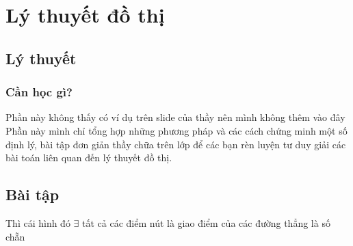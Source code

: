 \documentclass[12pt,oneside]{book}
\begin{document}
\chapter{Lý thuyết đồ thị}
\section{Lý thuyết}
\subsection{Cần học gì?}
Phần này không thấy có ví dụ trên slide của thầy nên mình không thêm vào đây
\\Phần này mình chỉ tổng hợp những phương pháp và các cách chứng minh một số định lý, bài tập đơn giản thầy chữa trên lớp để các bạn rèn luyện tư duy giải các bài toán liên quan đến lý thuyết đồ thị.
\section{Bài tập}
\begin{tcolorbox}[title=Vẽ 1 hình bằng 1 nét]
Thì cái hình đó $\exists$ tất cả các điểm nút là giao điểm của các đường thẳng là số chẵn
\end{tcolorbox}
\end{document}
